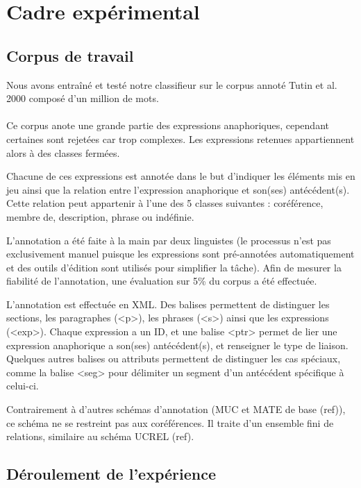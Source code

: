 \documentclass[a4paper,12pt]{article}
\begin{document}
\section{Cadre expérimental}

\subsection{Corpus de travail}

Nous avons entraîné et testé notre classifieur sur le corpus annoté Tutin et al. 2000 composé d'un million de mots.

\paragraph{}
Ce corpus anote une grande partie des expressions anaphoriques, cependant certaines sont rejetées car trop complexes. Les expressions retenues appartiennent alors à des classes fermées.

Chacune de ces expressions est annotée dans le but d'indiquer les éléments mis en jeu ainsi que la relation entre l'expression anaphorique et son(ses) antécédent(s). Cette relation peut appartenir à l'une des 5 classes suivantes : coréférence, membre de, description, phrase ou indéfinie.

L'annotation a été faite à la main par deux linguistes (le processus n'est pas exclusivement manuel puisque les expressions sont pré-annotées automatiquement et des outils d'édition sont utilisés pour simplifier la tâche). Afin de mesurer la fiabilité de l'annotation, une évaluation sur 5\% du corpus a été effectuée.

L'annotation est effectuée en XML. Des balises permettent de distinguer les sections, les paragraphes (<p>), les phrases (<s>) ainsi que les expressions (<exp>). Chaque expression a un ID, et une balise <ptr> permet de lier une expression anaphorique a son(ses) antécédent(s), et renseigner le type de liaison. Quelques autres balises ou attributs permettent de distinguer les cas spéciaux, comme la balise <seg> pour délimiter un segment d'un antécédent spécifique à celui-ci.

Contrairement à d'autres schémas d'annotation (MUC et MATE de base (ref)), ce schéma ne se restreint pas aux coréférences. Il traite d'un ensemble fini de relations, similaire au schéma UCREL (ref).


\subsection{Déroulement de l'expérience}
\end{document}
